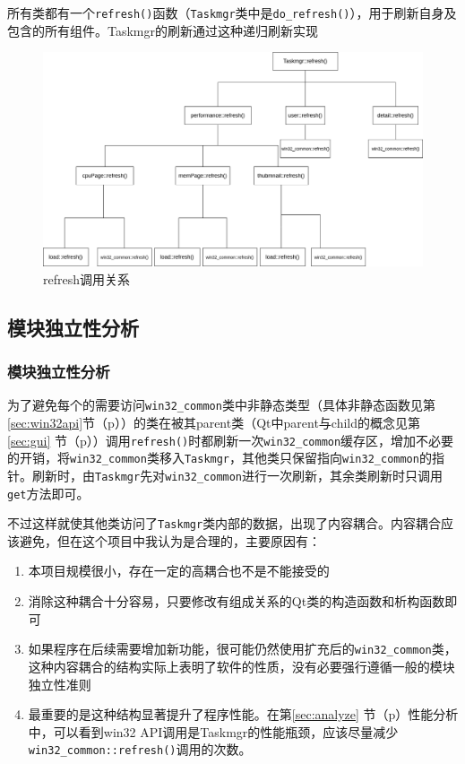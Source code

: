 \documentclass{beamer}
\newcommand\code[1]{\texttt{#1}}
\begin{document}
\begin{frame}
    所有类都有一个\code{refresh()}函数（\code{Taskmgr}类中是\code{do\_refresh()}），用于刷新自身及包含的所有组件。Taskmgr的刷新通过这种递归刷新实现
    \begin{figure}
        \centering
        \includegraphics[scale=0.24]{../dia/refresh call.png}
        \caption{refresh调用关系}
        \label{dia}
    \end{figure}
\end{frame}

\subsection{模块独立性分析}
\begin{frame}
    \frametitle{模块独立性分析}
    为了避免每个的需要访问\code{win32\_common}类中非静态类型（具体非静态函数见第\ref{sec:win32api}节（p\pageref{sec:win32api}））的类在被其parent类（Qt中parent与child的概念见第\ref{sec:gui} 节（p\pageref{sec:gui}））调用\code{refresh()}时都刷新一次\code{win32\_common}缓存区，增加不必要的开销，将\code{win32\_common}类移入\code{Taskmgr}，其他类只保留指向\code{win32\_common}的指针。刷新时，由\code{Taskmgr}先对\code{win32\_common}进行一次刷新，其余类刷新时只调用\code{get}方法即可。
\end{frame}

\begin{frame}
不过这样就使其他类访问了\code{Taskmgr}类内部的数据，出现了内容耦合。内容耦合应该避免，但在这个项目中我认为是合理的，主要原因有：
\begin{enumerate}
    \item 本项目规模很小，存在一定的高耦合也不是不能接受的
    \item 消除这种耦合十分容易，只要修改有组成关系的Qt类的构造函数和析构函数即可
    \item 如果程序在后续需要增加新功能，很可能仍然使用扩充后的\code{win32\_common}类，这种内容耦合的结构实际上表明了软件的性质，没有必要强行遵循一般的模块独立性准则
    \item 最重要的是这种结构显著提升了程序性能。在第\ref{sec:analyze} 节（p\pageref{sec:analyze}）性能分析中，可以看到win32 API调用是Taskmgr的性能瓶颈，应该尽量减少\code{win32\_common::refresh()}调用的次数。
\end{enumerate}
\end{frame}
\end{document}
